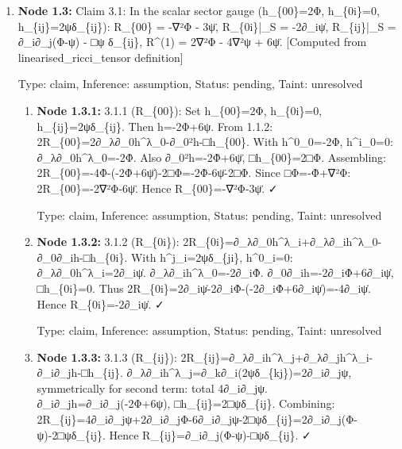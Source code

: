 \documentclass{article}
\begin{document}
\begin{enumerate}
\begin{enumerate}
  Type: claim, Inference: assumption, Status: pending, Taint: unresolved

\item \textbf{Node 1.2.5:} 2.1.5: The action I is constructed from R\textasciicircum{}(1)\_\{μν\} and R\textasciicircum{}(1)\}, both gauge-invariant at linear order (the linearised Riemann tensor is invariant under h\_\{μν\}→h\_\{μν\}+∂\_μξ\_ν+∂\_νξ\_μ). Therefore I expressed in Bardeen variables is gauge-independent. QED. [Ref: Gauge Invariance of Linearised Curvature]

  Type: claim, Inference: assumption, Status: pending, Taint: unresolved

\end{enumerate}
\item \textbf{Node 1.3:} Claim 3.1: In the scalar sector gauge (h\_\{00\}=2Φ, h\_\{0i\}=0, h\_\{ij\}=2ψδ\_\{ij\}): R\_\{00\} = -∇²Φ - 3ψ̈, R\_\{0i\}|\_S = -2∂\_iψ̇, R\_\{ij\}|\_S = ∂\_i∂\_j(Φ-ψ) - □ψ δ\_\{ij\}, R\textasciicircum{}(1) = 2∇²Φ - 4∇²ψ + 6ψ̈. [Computed from linearised\_ricci\_tensor definition]

  Type: claim, Inference: assumption, Status: pending, Taint: unresolved

\begin{enumerate}
\item \textbf{Node 1.3.1:} 3.1.1 (R\_\{00\}): Set h\_\{00\}=2Φ, h\_\{0i\}=0, h\_\{ij\}=2ψδ\_\{ij\}. Then h=-2Φ+6ψ. From 1.1.2: 2R\_\{00\}=2∂\_λ∂\_0h\textasciicircum{}λ\_0-∂\_0²h-□h\_\{00\}. With h\textasciicircum{}0\_0=-2Φ, h\textasciicircum{}i\_0=0: ∂\_λ∂\_0h\textasciicircum{}λ\_0=-2Φ̈. Also ∂\_0²h=-2Φ̈+6ψ̈, □h\_\{00\}=2□Φ. Assembling: 2R\_\{00\}=-4Φ̈-(-2Φ̈+6ψ̈)-2□Φ=-2Φ̈-6ψ̈-2□Φ. Since □Φ=-Φ̈+∇²Φ: 2R\_\{00\}=-2∇²Φ-6ψ̈. Hence R\_\{00\}=-∇²Φ-3ψ̈. ✓

  Type: claim, Inference: assumption, Status: pending, Taint: unresolved

\item \textbf{Node 1.3.2:} 3.1.2 (R\_\{0i\}): 2R\_\{0i\}=∂\_λ∂\_0h\textasciicircum{}λ\_i+∂\_λ∂\_ih\textasciicircum{}λ\_0-∂\_0∂\_ih-□h\_\{0i\}. With h\textasciicircum{}j\_i=2ψδ\_\{ji\}, h\textasciicircum{}0\_i=0: ∂\_λ∂\_0h\textasciicircum{}λ\_i=2∂\_iψ̇. ∂\_λ∂\_ih\textasciicircum{}λ\_0=-2∂\_iΦ̇. ∂\_0∂\_ih=-2∂\_iΦ̇+6∂\_iψ̇, □h\_\{0i\}=0. Thus 2R\_\{0i\}=2∂\_iψ̇-2∂\_iΦ̇-(-2∂\_iΦ̇+6∂\_iψ̇)=-4∂\_iψ̇. Hence R\_\{0i\}=-2∂\_iψ̇. ✓

  Type: claim, Inference: assumption, Status: pending, Taint: unresolved

\item \textbf{Node 1.3.3:} 3.1.3 (R\_\{ij\}): 2R\_\{ij\}=∂\_λ∂\_ih\textasciicircum{}λ\_j+∂\_λ∂\_jh\textasciicircum{}λ\_i-∂\_i∂\_jh-□h\_\{ij\}. ∂\_λ∂\_ih\textasciicircum{}λ\_j=∂\_k∂\_i(2ψδ\_\{kj\})=2∂\_i∂\_jψ, symmetrically for second term: total 4∂\_i∂\_jψ. ∂\_i∂\_jh=∂\_i∂\_j(-2Φ+6ψ), □h\_\{ij\}=2□ψδ\_\{ij\}. Combining: 2R\_\{ij\}=4∂\_i∂\_jψ+2∂\_i∂\_jΦ-6∂\_i∂\_jψ-2□ψδ\_\{ij\}=2∂\_i∂\_j(Φ-ψ)-2□ψδ\_\{ij\}. Hence R\_\{ij\}=∂\_i∂\_j(Φ-ψ)-□ψδ\_\{ij\}. ✓


\end{enumerate}
\end{enumerate}
\end{document}
